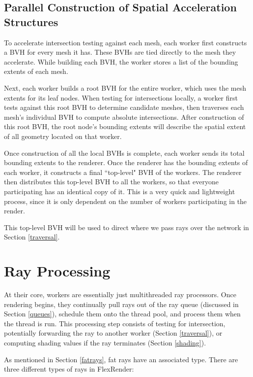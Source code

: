 \documentclass[12pt]{ucthesis}
\begin{document}
\subsection{Parallel Construction of Spatial Acceleration Structures}
\label{parallelbvh}

To accelerate intersection testing against each mesh, each worker first
constructs a BVH for every mesh it has. These BVHs are tied directly to the mesh
they accelerate. While building each BVH, the worker stores a list of the bounding
extents of each mesh.

Next, each worker builds a root BVH for the entire worker, which uses the mesh
extents for its leaf nodes. When testing for intersections locally, a worker
first tests against this root BVH to determine candidate meshes, then traverses
each mesh's individual BVH to compute absolute intersections. After construction
of this root BVH, the root node's bounding extents will describe the spatial
extent of all geometry located on that worker.

Once construction of all the local BVHs is complete, each worker sends its
total bounding extents to the renderer. Once the renderer has the bounding
extents of each worker, it constructs a final ``top-level" BVH of the workers.
The renderer then distributes this top-level BVH to all the workers, so that
everyone participating has an identical copy of it. This is a very quick and
lightweight process, since it is only dependent on the number of workers
participating in the render.

This top-level BVH will be used to direct where we pass rays over the network
in Section \ref{traversal}.

\section{Ray Processing}
\label{process}

At their core, workers are essentially just multithreaded ray processors. Once
rendering begins, they continually pull rays out of the ray queue (discussed in
Section \ref{queues}), schedule them onto the thread pool, and process them
when the thread is run. This processing step consists of testing for intersection,
potentially forwarding the ray to another worker (Section \ref{traversal}),
or computing shading values if the ray terminates (Section \ref{shading}).

As mentioned in Section \ref{fatrays}, fat rays have an associated type. There
are three different types of rays in FlexRender:
\end{document}
